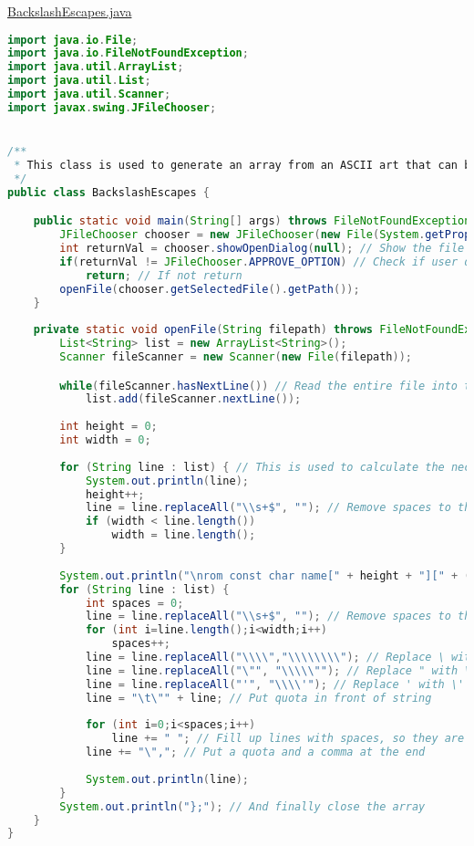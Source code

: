 \underline{BackslashEscapes.java}
\begin{lstlisting}[language=Java]
import java.io.File;
import java.io.FileNotFoundException;
import java.util.ArrayList;
import java.util.List;
import java.util.Scanner;
import javax.swing.JFileChooser;


/**
 * This class is used to generate an array from an ASCII art that can be put directly into the .c file.
 */
public class BackslashEscapes {

	public static void main(String[] args) throws FileNotFoundException {
		JFileChooser chooser = new JFileChooser(new File(System.getProperty("user.home"))); // Create the FileChooser instance 
		int returnVal = chooser.showOpenDialog(null); // Show the file dialog
		if(returnVal != JFileChooser.APPROVE_OPTION) // Check if user didn't press OK
			return; // If not return
		openFile(chooser.getSelectedFile().getPath());
	}
	
	private static void openFile(String filepath) throws FileNotFoundException {
		List<String> list = new ArrayList<String>();
		Scanner fileScanner = new Scanner(new File(filepath));

		while(fileScanner.hasNextLine()) // Read the entire file into the list
			list.add(fileScanner.nextLine());
		
		int height = 0;
		int width = 0;
		
		for (String line : list) { // This is used to calculate the necessary height and width of the array
			System.out.println(line);
			height++;
			line = line.replaceAll("\\s+$", ""); // Remove spaces to the right
			if (width < line.length())
				width = line.length();
		}
		
		System.out.println("\nrom const char name[" + height + "][" + (width+1) + "] = {"); // Make room for null-character
		for (String line : list) {
			int spaces = 0;			
			line = line.replaceAll("\\s+$", ""); // Remove spaces to the right
			for (int i=line.length();i<width;i++)
				spaces++;
			line = line.replaceAll("\\\\","\\\\\\\\"); // Replace \ with \\
			line = line.replaceAll("\"", "\\\\\""); // Replace " with \"
			line = line.replaceAll("'", "\\\\'"); // Replace ' with \'
			line = "\t\"" + line; // Put quota in front of string 
			
			for (int i=0;i<spaces;i++)
				line += " "; // Fill up lines with spaces, so they are all the same length
			line += "\","; // Put a quota and a comma at the end
			
			System.out.println(line);
		}
		System.out.println("};"); // And finally close the array
	}
}
\end{lstlisting}
\newpage